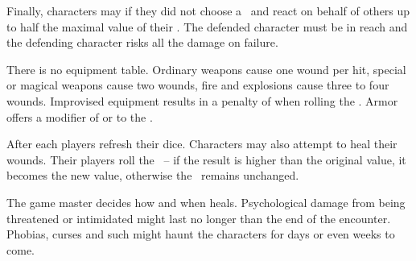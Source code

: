 {		Finally, characters may  if they did not choose a \AD\ and react on behalf of others up to half the maximal value of their \RD. The defended character must be in reach and the defending character risks all the damage on failure.


		\noindent
		There is no equipment table. Ordinary weapons cause one wound per hit, special or magical weapons cause two wounds, fire and explosions cause three to four wounds. Improvised equipment results in a penalty of  when rolling the \AD. Armor offers a modifier of  or  to the \RD.


		\noindent
		After each  players refresh their dice. Characters may also attempt to heal their wounds. Their players roll the \HD\ -- if the result is higher than the original value, it becomes the new value, otherwise the \HD\ remains unchanged.

		The game master decides how and when  heals. Psychological damage from being threatened or intimidated might last no longer than the end of the encounter. Phobias, curses and such might haunt the characters for days or even weeks to come.
}

